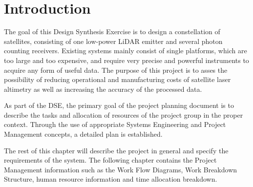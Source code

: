 \section{Introduction}
\label{dsePPIntro}
The goal of this Design Synthesis Exercise is to design a constellation of satellites, consisting of one low-power LiDAR emitter and several photon counting receivers. Existing systems mainly consist of single platforms, which are too large and too expensive, and require very precise and powerful instruments to acquire any form of useful data. The purpose of this project is to asses the possibility of reducing operational and manufacturing costs of satellite laser altimetry as well as increasing the accuracy of the processed data.

As part of the DSE, the primary goal of the project planning document is to describe the tasks and allocation of resources of the project group in the proper context. Through the use of appropriate Systems Engineering and Project Management concepts, a detailed plan is established.

The rest of this chapter will describe the project in general and specify the requirements of the system. The following chapter contains the Project Management information such as the Work Flow Diagrams, Work Breakdown Structure, human resource information and time allocation breakdown. 